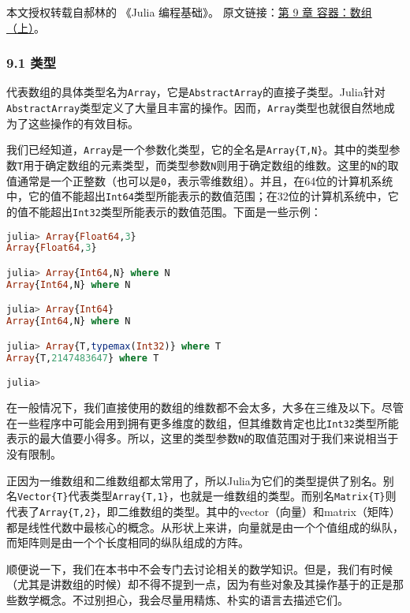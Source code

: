 
本文授权转载自郝林的 《Julia 编程基础》。 原文链接：\href{https://github.com/hyper0x/JuliaBasics/blob/master/book/ch09.md}{第 9 章 容器：数组（上）}。


\subsubsection{9.1 类型}

代表数组的具体类型名为\verb|Array|，它是\verb|AbstractArray|的直接子类型。Julia针对\verb|AbstractArray|类型定义了大量且丰富的操作。因而，\verb|Array|类型也就很自然地成为了这些操作的有效目标。

我们已经知道，\verb|Array|是一个参数化类型，它的全名是\verb|Array{T,N}|。其中的类型参数\verb|T|用于确定数组的元素类型，而类型参数\verb|N|则用于确定数组的维数。这里的\verb|N|的取值通常是一个正整数（也可以是\verb|0|，表示零维数组）。并且，在64位的计算机系统中，它的值不能超出\verb|Int64|类型所能表示的数值范围；在32位的计算机系统中，它的值不能超出\verb|Int32|类型所能表示的数值范围。下面是一些示例：

\begin{lstlisting}[language=julia]
julia> Array{Float64,3}
Array{Float64,3}

julia> Array{Int64,N} where N
Array{Int64,N} where N

julia> Array{Int64}
Array{Int64,N} where N

julia> Array{T,typemax(Int32)} where T
Array{T,2147483647} where T

julia> 
\end{lstlisting}

在一般情况下，我们直接使用的数组的维数都不会太多，大多在三维及以下。尽管在一些程序中可能会用到拥有更多维度的数组，但其维数肯定也比\verb|Int32|类型所能表示的最大值要小得多。所以，这里的类型参数\verb|N|的取值范围对于我们来说相当于没有限制。

正因为一维数组和二维数组都太常用了，所以Julia为它们的类型提供了别名。别名\verb|Vector{T}|代表类型\verb|Array{T,1}|，也就是一维数组的类型。而别名\verb|Matrix{T}|则代表了\verb|Array{T,2}|，即二维数组的类型。其中的vector（向量）和matrix（矩阵）都是线性代数中最核心的概念。从形状上来讲，向量就是由一个个值组成的纵队，而矩阵则是由一个个长度相同的纵队组成的方阵。

顺便说一下，我们在本书中不会专门去讨论相关的数学知识。但是，我们有时候（尤其是讲数组的时候）却不得不提到一点，因为有些对象及其操作基于的正是那些数学概念。不过别担心，我会尽量用精炼、朴实的语言去描述它们。


